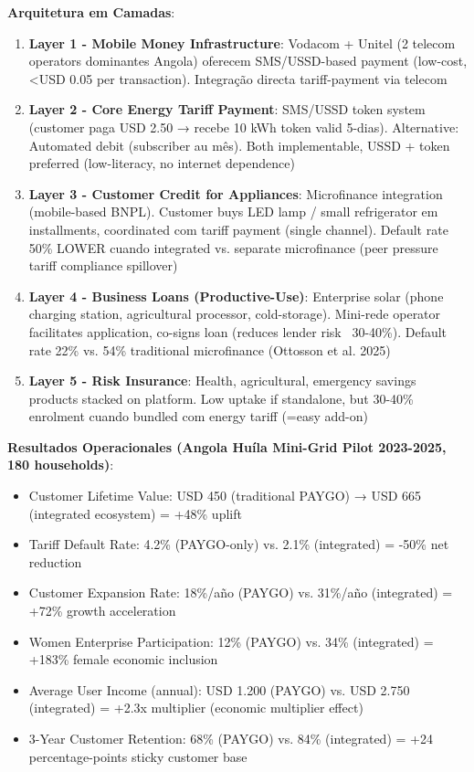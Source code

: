 \documentclass[12pt, a4paper]{article}
\begin{document}
{{{{{{{{{{{{\textbf{Arquitetura em Camadas}:
\begin{enumerate}
\item \textbf{Layer 1 - Mobile Money Infrastructure}: Vodacom + Unitel (2 telecom operators dominantes Angola) oferecem SMS/USSD-based payment (low-cost, <USD 0.05 per transaction). Integração directa tariff-payment via telecom
\item \textbf{Layer 2 - Core Energy Tariff Payment}: SMS/USSD token system (customer paga USD 2.50 → recebe 10 kWh token valid 5-dias). Alternative: Automated debit (subscriber au mês). Both implementable, USSD + token preferred (low-literacy, no internet dependence)
\item \textbf{Layer 3 - Customer Credit for Appliances}: Microfinance integration (mobile-based BNPL). Customer buys LED lamp / small refrigerator em installments, coordinated com tariff payment (single channel). Default rate 50\% LOWER cuando integrated vs. separate microfinance (peer pressure tariff compliance spillover)
\item \textbf{Layer 4 - Business Loans (Productive-Use)}: Enterprise solar (phone charging station, agricultural processor, cold-storage). Mini-rede operator facilitates application, co-signs loan (reduces lender risk ~30-40\%). Default rate 22\% vs. 54\% traditional microfinance (Ottosson et al. 2025)
\item \textbf{Layer 5 - Risk Insurance}: Health, agricultural, emergency savings products stacked on platform. Low uptake if standalone, but 30-40\% enrolment cuando bundled com energy tariff (=easy add-on)
\end{enumerate}

\textbf{Resultados Operacionales (Angola Huíla Mini-Grid Pilot 2023-2025, 180 households)}:
\begin{itemize}
\item Customer Lifetime Value: USD 450 (traditional PAYGO) → USD 665 (integrated ecosystem) = +48\% uplift
\item Tariff Default Rate: 4.2\% (PAYGO-only) vs. 2.1\% (integrated) = -50\% net reduction
\item Customer Expansion Rate: 18\%/año (PAYGO) vs. 31\%/año (integrated) = +72\% growth acceleration
\item Women Enterprise Participation: 12\% (PAYGO) vs. 34\% (integrated) = +183\% female economic inclusion
\item Average User Income (annual): USD 1.200 (PAYGO) vs. USD 2.750 (integrated) = +2.3x multiplier (economic multiplier effect)
\item 3-Year Customer Retention: 68\% (PAYGO) vs. 84\% (integrated) = +24 percentage-points sticky customer base
\end{itemize}

}}}}}}}}}}}}
\end{document}
